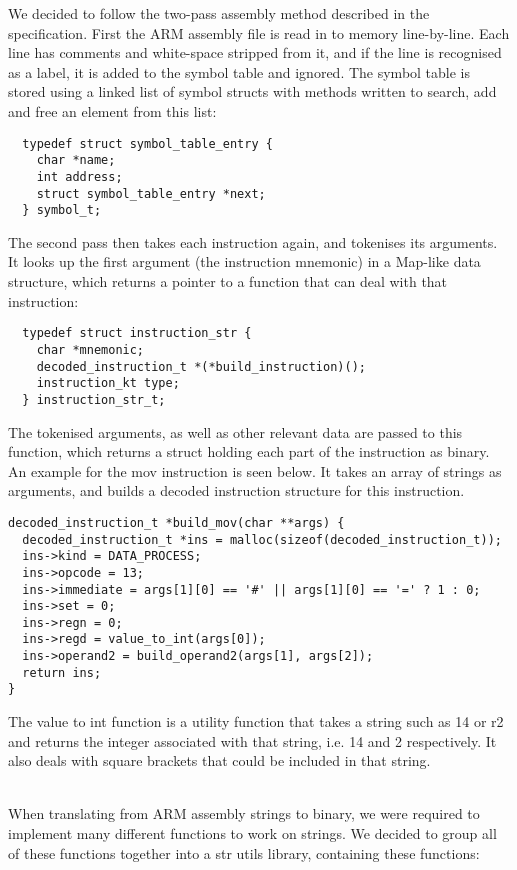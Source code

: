 We decided to follow the two-pass assembly method described in the specification. First the ARM assembly file is read in to memory line-by-line. Each line has comments and white-space stripped from it, and if the line is recognised as a label, it is added to the symbol table and ignored. The symbol table is stored using a linked list of symbol structs with methods written to search, add and free an element from this list:

\begin{verbatim}
  typedef struct symbol_table_entry {
    char *name;
    int address;
    struct symbol_table_entry *next;
  } symbol_t;
\end{verbatim}


The second pass then takes each instruction again, and tokenises its arguments. It looks up the first argument (the instruction mnemonic) in a Map-like data structure, which returns a pointer to a function that can deal with that instruction:

\begin{verbatim}
  typedef struct instruction_str {
    char *mnemonic;
    decoded_instruction_t *(*build_instruction)();
    instruction_kt type;
  } instruction_str_t;
\end{verbatim}

The tokenised arguments, as well as other relevant data are passed to this function, which returns a struct holding each part of the instruction as binary. An example for the mov instruction is seen below. It takes an array of strings as arguments, and builds a decoded instruction structure for this instruction. 

\begin{verbatim}
decoded_instruction_t *build_mov(char **args) {
  decoded_instruction_t *ins = malloc(sizeof(decoded_instruction_t));
  ins->kind = DATA_PROCESS;
  ins->opcode = 13;
  ins->immediate = args[1][0] == '#' || args[1][0] == '=' ? 1 : 0;
  ins->set = 0;
  ins->regn = 0;
  ins->regd = value_to_int(args[0]);
  ins->operand2 = build_operand2(args[1], args[2]);
  return ins;
}
\end{verbatim}

The value to int function is a utility function that takes a string such as 14 or r2 and returns the integer associated with that string, i.e. 14 and 2 respectively. It also deals with square brackets that could be included in that string. 

~\\

When translating from ARM assembly strings to binary, we were required to implement many different functions to work on strings. We decided to group all of these functions together into a str utils library, containing these functions:

